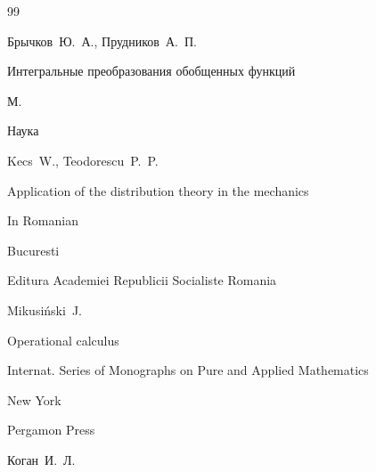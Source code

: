 \begin{thebibliography}{99}

\by Брычков~Ю.~А., Прудников~А.~П.

\book Интегральные преобразования обобщенных функций

\publaddr М.

\publ Наука















\by Kecs~W., Teodorescu~P.~P.

\book Application of the distribution theory in the mechanics

\lang In Romanian

\publaddr Bucuresti

\publ Editura Academiei Republicii Socialiste Romania







\by Mikusi\'nski~J.

\book Operational calculus

\serial Internat. Series of Monographs on Pure and Applied Mathematics


\publaddr New York

\publ Pergamon Press







\by Коган~И.~Л.


\end{thebibliography}
